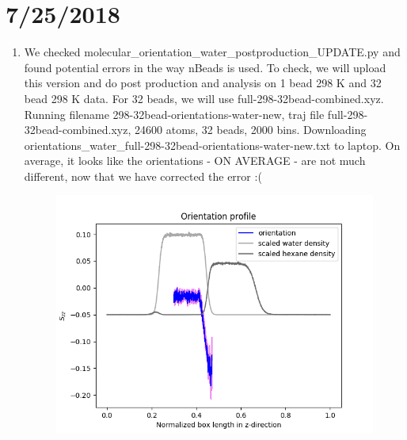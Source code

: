 \documentclass[12pt,reqno]{amsart}
\numberwithin{equation}{section}
\begin{document}
\section{7/25/2018}
\begin{enumerate}
\item We checked molecular\_orientation\_water\_postproduction\_UPDATE.py and found potential errors in the way nBeads is used.  To check, we will upload this version and do post production and analysis on 1 bead 298 K and 32 bead 298 K data.  For 32 beads, we will use full-298-32bead-combined.xyz.   Running filename 298-32bead-orientations-water-new, traj file full-298-32bead-combined.xyz, 24600 atoms, 32 beads, 2000 bins.  Downloading orientations\_water\_full-298-32bead-orientations-water-new.txt to laptop.  On average, it looks like the orientations - ON AVERAGE - are not much different, now that we have corrected the error :(
\begin{figure}[H]
\centering
\includegraphics[scale=0.6]{full-298-32bead-combined-orientations-water-new}
\end{figure}


\end{enumerate}
\end{document}
